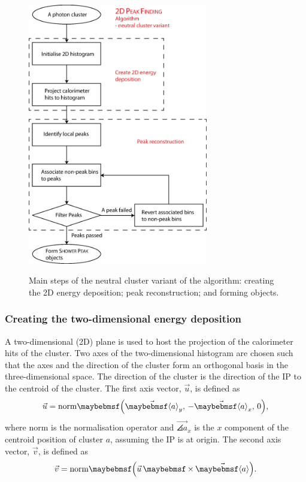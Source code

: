 \begin{figure}[tbph]
\centering
{\includegraphics[width=0.7\textwidth]{photon/2DpeakFinding4}}
\caption[Flow chart for \peakFinding algorithm neutral cluster variant.]
{Main steps of the  neutral cluster variant of the \peakFinding algorithm: creating the 2D energy deposition; peak reconstruction; and forming \ShowerPeak objects.}
\label{fig:photonPeakFindingFlowNeutral}
\end{figure}

\subsubsection{Creating the two-dimensional energy deposition}

A two-dimensional (2D) plane is used to host the projection of the calorimeter hits of the cluster.  Two axes of the two-dimensional histogram are chosen such that the axes and the direction of the cluster form an orthogonal basis  in the three-dimensional space. The direction of the cluster is the direction of the IP to the centroid of the cluster. The first axis vector, $\vec{u}$,  is defined as
\begin{equation}
\vec{u} = \text{norm}\parenths{\vec{\angles{a}}_y,\, - \vec{\angles{a}}_x,\,0},
\end{equation}
where  norm is the normalisation operator and $ \vec{\angles{a}}_x$ is the $x$ component of the centroid position of cluster $a$, assuming the IP is at origin. The second axis vector, $\vec{v}$, is defined as
\begin{equation}
\vec{v} = \text{norm}\parenths{\vec{u}\, \times \vec{\angles{a}}}.
\end{equation}

